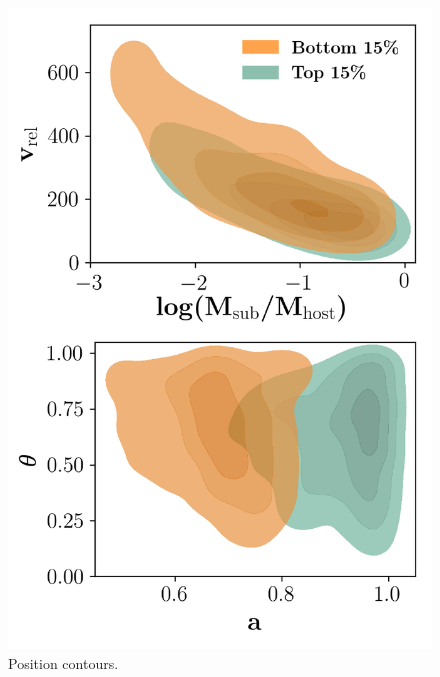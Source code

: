 \documentclass[fleqn,usenatbib]{mnras}
\begin{document}
\begin{figure}
	\includegraphics[width=\textwidth]{Figures/position_contours}
    \caption{Position contours.}
    \label{fig:position_contours}
\end{figure}
\end{document}
